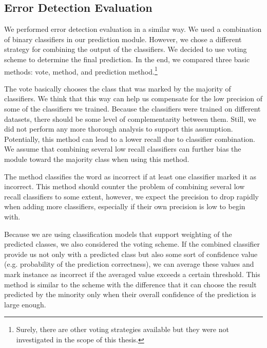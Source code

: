 \subsection{Error Detection Evaluation}

We performed error detection evaluation in a similar way. We used a combination
of binary classifiers in our prediction module. However, we chose a different strategy
for combining the output of the classifiers.
We decided to use voting scheme to determine the final prediction.
In the end, we compared three basic methods:  vote,  method,
and  prediction method.\footnote{Surely, there are other voting strategies available
but they were not investigated in the scope of this thesis.}

The  vote basically chooses the class that was marked by the majority of classifiers.
We think that this way can help us compensate for the low precision of some of the classifiers we trained.
Because the classifiers were trained on different datasets, there should be some level of complementarity
between them. Still, we did not perform any more thorough analysis to support this assumption.
Potentially, this method can lead to a lower recall due to classifier combination.
We assume that
combining several low recall classifiers can further bias the module toward the majority class when using
this method.

The  method classifies the word as incorrect if at least one classifier marked it
as incorrect. This method should counter the problem of combining several low recall classifiers to some
extent, however, we expect the precision to drop rapidly when adding more classifiers, especially if their own
precision is low to begin with.

Because we are using classification models that support weighting of the predicted classes, we
also considered the  voting scheme. If the combined classifier provide us not only with
a predicted class but also some sort of confidence value (e.g. probability of the prediction correctness),
we can average these values and mark instance as incorrect if the averaged value exceeds a certain threshold.
This method is similar to the  scheme with the difference that it can choose the result
predicted by the minority only when their overall confidence of the prediction is large enough.

